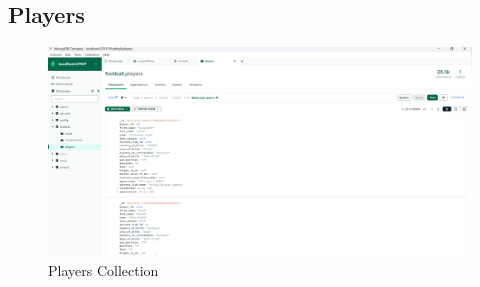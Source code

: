 \documentclass{Configuration_Files/PoliMi3i_thesis}
\begin{document}
\subsection{Players}
\begin{figure}[htbp]
    \centering
    \includegraphics[scale=0.45]{Images/Dataset/players.png}
    \caption{Players Collection}
\end{figure}
\end{document}

